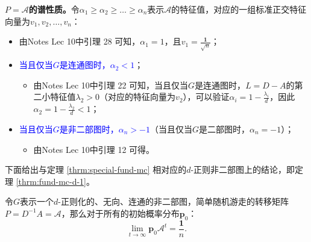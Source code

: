     \vspace{0.2cm}
    \textbf{$P=\mathcal{A}$的谱性质。}令$\alpha_1\ge \alpha_2\ge \dots\ge \alpha_n$表示$\mathcal{A}$的特征值，对应的一组标准正交特征向量为$v_1,v_2,\dots,v_n$：
    \begin{itemize}
        \item 由Notes Lec 10中引理 28 可知，$\alpha_1=1$，且$v_1=\frac{\bm{1}}{\sqrt{n}}$；
        \item \textcolor{blue}{当且仅当$G$是连通图时，$\alpha_2<1$}；
            \begin{itemize}
                \item 由Notes Lec 10中引理 22 可知，当且仅当$G$是连通图时，$L=D-A$的第二小特征值$\lambda_2>0$（对应的特征向量为$v_2$），可以验证$\alpha_i=1-\frac{\lambda_i}{d}$，因此$\alpha_2=1-\frac{\lambda_2}{d}<1$；
            \end{itemize}
        \item \textcolor{blue}{当且仅当$G$是非二部图时，$\alpha_n>-1$}（当且仅当$G$是二部图时，$\alpha_n=-1$）；
            \begin{itemize}
                \item 由Notes Lec 10中引理 12 可得。
            \end{itemize}
        \end{itemize}

    \vspace{0.25cm}
    下面给出与定理 \ref{thrm:special-fund-mc} 相对应的$d$-正则非二部图上的结论，即定理 \ref{thrm:fund-mc-d-1}。
            
    \begin{theorem}
        \label{thrm:fund-mc-d-1}
        令$G$表示一个$d$-正则化的、无向、连通的非二部图，简单随机游走的转移矩阵$P=D^{-1}A=\mathcal{A}$，那么对于所有的初始概率分布$\bm{p}_0$：
        \[
            \lim_{t \to \infty} \bm{p}_0\mathcal{A}^t  = \frac{\bm{1}}{n}.
        \]
    \end{theorem}

